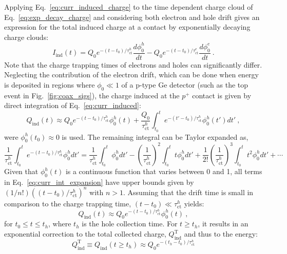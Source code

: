 Applying Eq.~\ref{eq:curr_induced_charge} to the time dependent charge cloud of Eq.~\ref{eq:exp_decay_charge} and considering both electron and hole drift gives an expression for the total induced charge at a contact by exponentially decaying charge clouds:
\begin{equation}
	I_\text{ind}(t) = Q_0e^{-(t-t_0)/\tau^h_\text{ct}}\frac{d\phi^h_0}{dt} - Q_0e^{-(t-t_0)/\tau^e_\text{ct}}\frac{d\phi^e_0}{dt}~.
	\label{eq:curr_induced}
\end{equation} 
Note that the charge trapping times of electrons and holes can significantly differ. Neglecting the contribution of the electron drift, which can be done when energy is deposited in regions where $\phi_0 \ll 1$ of a p-type Ge detector (such as the top event in Fig.~\ref{fig:coax_sigs}), the charge induced at the $p^+$ contact is given by direct integration of Eq.~\ref{eq:curr_induced}:
\begin{equation}
	Q_\text{ind}(t) \approx Q_0e^{-(t-t_0)/\tau^h_\text{ct}}\phi^h_0(t) + \frac{Q_0}{\tau^h_\text{ct}}\int_{t_0}^{t}e^{-(t'-t_0)/\tau^h_\text{ct}}\phi^h_0(t')dt'~,
\end{equation}
were $\phi^h_0(t_0) \approx 0$ is used. The remaining integral can be Taylor expanded as,
\begin{equation}
	\frac{1}{\tau^h_\text{ct}}\int_{t_0}^{t}e^{-(t-t_0)/\tau^h_\text{ct}}\phi^h_0dt' = \frac{1}{\tau^h_\text{ct}}\int_{t_0}^{t}\phi^h_0dt' - \left(\frac{1}{\tau^h_\text{ct}}\right)^2\int_{t_0}^{t}t\phi^h_0dt' + \frac{1}{2!}\left(\frac{1}{\tau^h_\text{ct}}\right)^3\int_{t_0}^{t}t^2\phi^h_0dt' + \cdots
	\label{eq:curr_int_expansion}
\end{equation} 
Given that $\phi^h_0(t)$ is a continuous function that varies between 0 and 1, all terms in Eq.~\ref{eq:curr_int_expansion} have upper bounds given by $(1/n!)((t-t_0)/\tau^h_\text{ct})^n$ with $n>1$. Assuming that the drift time is small in comparison to the charge trapping time, $(t-t_0)\ll\tau^h_\text{ct}$ yields:
\begin{equation}
	Q_\text{ind}(t) \approx Q_0e^{-(t-t_0)/\tau^h_\text{ct}}\phi^h_0(t)~,
	\label{eq:exp_decay_charge_ind}
\end{equation}
for $t_0 \le t \le t_h$, where $t_h$ is the hole collection time. For $t \ge t_h$, it results in an exponential correction to the total collected charge, $Q^\text{T}_\text{ind}$ and thus to the energy:
\begin{equation}
	Q^\text{T}_\text{ind} \equiv Q_\text{ind}(t \ge t_h) \approx Q_0e^{-(t_h-t_0)/\tau^h_\text{ct}}
	\label{eq:charge_ind_corr}
\end{equation}
